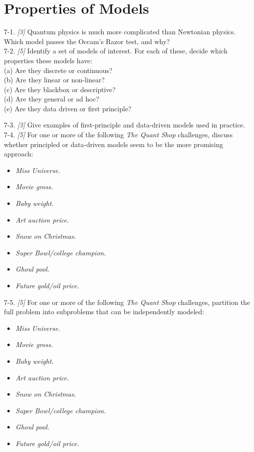 \documentclass[10pt]{article}
\begin{document}
\section*{Properties of Models}
7-1. \textit{[3]} Quantum physics is much more complicated than Newtonian physics. Which model passes the Occam's Razor test, and why?\\[0pt]
7-2. \textit{[5]} Identify a set of models of interest. For each of these, decide which properties these models have:\\
(a) Are they discrete or continuous?\\
(b) Are they linear or non-linear?\\
(c) Are they blackbox or descriptive?\\
(d) Are they general or ad hoc?\\
(e) Are they data driven or first principle?

7-3. \textit{[3]} Give examples of first-principle and data-driven models used in practice.\\[0pt]
7-4. \textit{[5]} For one or more of the following \textit{The Quant Shop} challenges, discuss whether principled or data-driven models seem to be the more promising approach:

\begin{itemize}
  \item \textit{Miss Universe.}
  \item \textit{Movie gross.}
  \item \textit{Baby weight.}
  \item \textit{Art auction price.}
  \item \textit{Snow on Christmas.}
  \item \textit{Super Bowl/college champion.}
  \item \textit{Ghoul pool.}
  \item \textit{Future gold/oil price.}
\end{itemize}

7-5. \textit{[5]} For one or more of the following \textit{The Quant Shop} challenges, partition the full problem into subproblems that can be independently modeled:

\begin{itemize}
  \item \textit{Miss Universe.}
  \item \textit{Movie gross.}
  \item \textit{Baby weight.}
  \item \textit{Art auction price.}
  \item \textit{Snow on Christmas.}
  \item \textit{Super Bowl/college champion.}
  \item \textit{Ghoul pool.}
  \item \textit{Future gold/oil price.}
\end{itemize}
\end{document}
